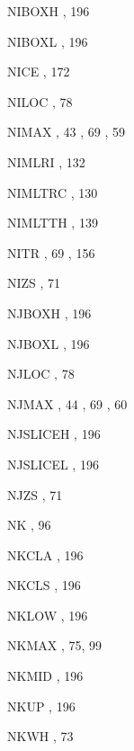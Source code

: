 \begin{theindex}
  \item NIBOXH
    \subitem {},  196
  \item NIBOXL
    \subitem {},  196
  \item NICE
    \subitem {},  172
  \item NILOC
    \subitem {},  78
  \item NIMAX
    \subitem {},  43
    \subitem {},  69
    \subitem {},  59
  \item NIMLRI
    \subitem {},  132
  \item NIMLTRC
    \subitem {},  130
  \item NIMLTTH
    \subitem {},  139
  \item NITR
    \subitem {},  69
    \subitem {},  156
  \item NIZS
    \subitem {},  71
  \item NJBOXH
    \subitem {},  196
  \item NJBOXL
    \subitem {},  196
  \item NJLOC
    \subitem {},  78
  \item NJMAX
    \subitem {},  44
    \subitem {},  69
    \subitem {},  60
  \item NJSLICEH
    \subitem {},  196
  \item NJSLICEL
    \subitem {},  196
  \item NJZS
    \subitem {},  71
  \item NK
    \subitem {},  96
  \item NKCLA
    \subitem {},  196
  \item NKCLS
    \subitem {},  196
  \item NKLOW
    \subitem {},  196
  \item NKMAX
    \subitem {},  75, 99
  \item NKMID
    \subitem {},  196
  \item NKUP
    \subitem {},  196
  \item NKWH
    \subitem {},  73

\end{theindex}
